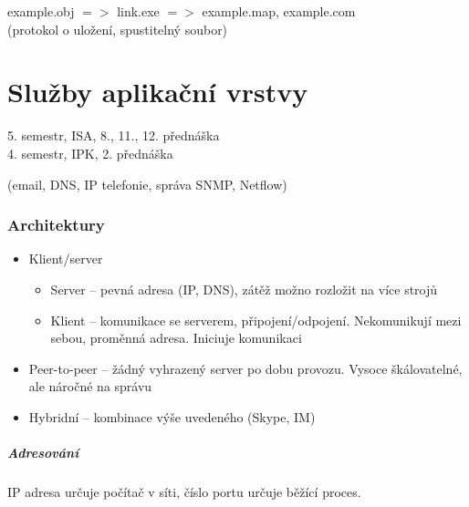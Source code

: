 \documentclass[a4paper, 11pt]{report}
\begin{document}
example.obj $=>$ link.exe $=>$ example.map, example.com\\
 (protokol o uložení, spustitelný soubor)






























\chapter{Služby aplikační vrstvy} \label{cha:38}

5. semestr, ISA, 8., 11., 12. přednáška\\
4. semestr, IPK, 2. přednáška

(email, DNS, IP telefonie, správa SNMP, Netflow)

\subsection{Architektury}
\begin{itemize}
	\item Klient/server
	\begin{itemize}
		\item Server -- pevná adresa (IP, DNS), zátěž možno rozložit na více strojů
		\item Klient -- komunikace se serverem, připojení/odpojení. Nekomunikují mezi sebou, proměnná adresa. Iniciuje komunikaci
	\end{itemize}
	\item Peer-to-peer -- žádný vyhrazený server po dobu provozu. Vysoce škálovatelné, ale náročné na správu
	\item Hybridní -- kombinace výše uvedeného (Skype, IM)
\end{itemize}

\paragraph{Adresování} IP adresa určuje počítač v síti, číslo portu určuje běžící proces.
\end{document}
